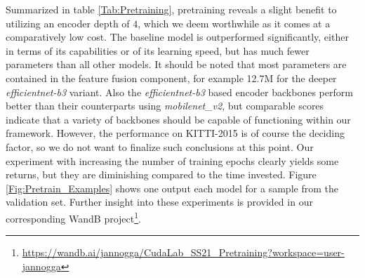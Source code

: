 \documentclass[runningheads]{llncs}
\begin{document}
Summarized in table \ref{Tab:Pretraining}, pretraining reveals a slight benefit to utilizing an encoder depth of $4$, which we deem worthwhile as it comes at a comparatively low cost. The baseline model is outperformed significantly, either in terms of its capabilities or of its learning speed, but has much fewer parameters than all other models. It should be noted that most parameters are contained in the feature fusion component, for example 12.7M for the deeper \textit{efficientnet-b3} variant. Also the \textit{efficientnet-b3} based encoder backbones perform better than their counterparts using \textit{mobilenet\_v2}, but comparable scores indicate that a variety of backbones should be capable of functioning within our framework. However, the performance on KITTI-2015 is of course the deciding factor, so we do not want to finalize such conclusions at this point. Our experiment with increasing the number of training epochs clearly yields some returns, but they are diminishing compared to the time invested. Figure \ref{Fig:Pretrain_Examples} shows one output each model for a sample from the validation set. Further insight into these experiments is provided in our corresponding WandB \cite{wandb} project\footnote{\url{https://wandb.ai/jannogga/CudaLab_SS21_Pretraining?workspace=user-jannogga}}.
\end{document}
